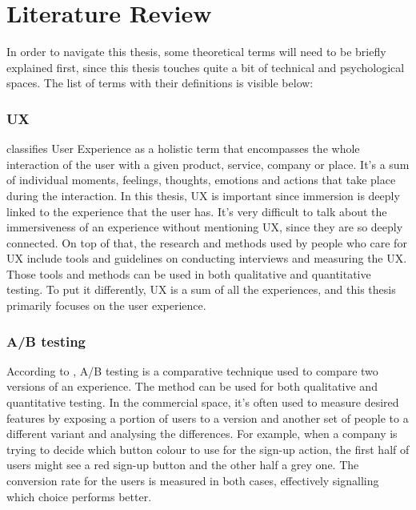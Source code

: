 \chapter{Literature Review} 



\label{ch:review}

In order to navigate this thesis, some theoretical terms will need to be briefly explained first, since this thesis touches quite a bit of technical and psychological spaces. The list of terms with their definitions is visible below:



\subsection{UX}
\textcite{ibmWhatUserExperience2025} classifies User Experience as a holistic term that encompasses the whole interaction of the user with a given product, service, company or place. It's a sum of individual moments, feelings, thoughts, emotions and actions that take place during the interaction.
In this thesis, UX is important since immersion is deeply linked to the experience that the user has. 
It's very difficult to talk about the immersiveness of an experience without mentioning UX, since  they are so deeply connected. On top of that, the research and methods used by people who care for UX include tools and guidelines on conducting interviews and measuring the UX.
Those tools and methods can be used in both qualitative and quantitative testing.
To put it differently, UX is a sum of all the experiences, and this thesis primarily focuses on the user experience. 


\subsection{A/B testing}


According to \textcite{youngImprovingLibraryUser2014}, A/B testing is a comparative technique used to compare two versions of an experience.
The method can be used for both qualitative and quantitative testing.
In the commercial space, it's often used to measure desired features by exposing a portion of users to a version and another set of people to a different variant and analysing the differences. 
For example, when a company is trying to decide which button colour to use for the sign-up action, the first half of users might see a red sign-up button and the other half a grey one. The conversion rate for the users is measured in both cases, effectively signalling which choice performs better. 

